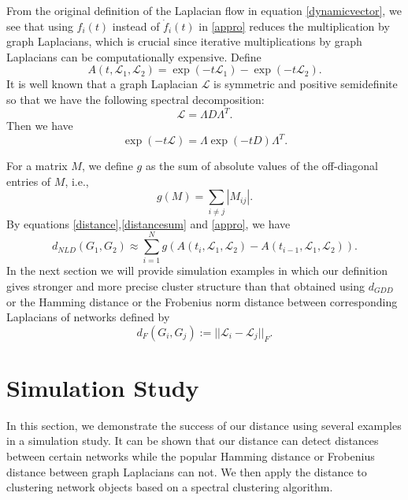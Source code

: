 \documentclass{amsart}
\begin{document}
From the original definition of the Laplacian flow in equation \eqref{dynamicvector}, we see that using $f_i(t)$ instead of $\dot{f}_i(t)$ in \eqref{appro} reduces the multiplication by graph Laplacians, which is crucial since iterative multiplications by graph Laplacians can be computationally expensive. Define 
\begin{equation}
A(t,\mathcal{L}_1,\mathcal{L}_2)=\exp(-t\mathcal{L}_1)-\exp(-t\mathcal{L}_2).
\end{equation}
It is well known that a graph Laplacian $\mathcal{L}$ is symmetric and positive
semidefinite so that we have the following spectral decomposition:
\begin{equation}
\mathcal{L}=\Lambda D\Lambda^{T}. 
\end{equation}
Then we have 
\begin{equation}
\exp(-t\mathcal{L})=\Lambda \exp(-tD)\Lambda^{T}.
\end{equation}

For a matrix $M$, we define $g$ as the sum of absolute values of the off-diagonal entries of $M$, i.e.,
\begin{equation}
g(M)=\sum_{i\neq j}|M_{ij}|.
\end{equation}
By equations \eqref{distance},\eqref{distancesum} and \eqref{appro}, we have
\begin{equation}
d_{NLD}(G_1,G_2)\approx\sum_{i=1}^{N}g(A(t_i,\mathcal{L}_1,\mathcal{L}_2)-A(t_{i-1},\mathcal{L}_1,\mathcal{L}_2)).
\end{equation}
In the next section we will provide simulation examples in which our definition gives stronger and more precise cluster structure than that obtained using $d_{GDD}$ or the Hamming distance or the Frobenius norm distance between corresponding Laplacians of networks defined by $$d_F(G_i,G_j):=||\mathcal{L}_i-\mathcal{L}_j||_F.$$

	

	
	\section{Simulation Study }\label{simulation}
	
	
	In this section, we demonstrate the success of our distance using several examples in a simulation study. It can be shown that our distance can detect distances between certain networks while the popular Hamming distance or Frobenius distance between graph Laplacians can not.  We then apply the distance to clustering network objects based on a spectral clustering algorithm. 
	
\end{document}
